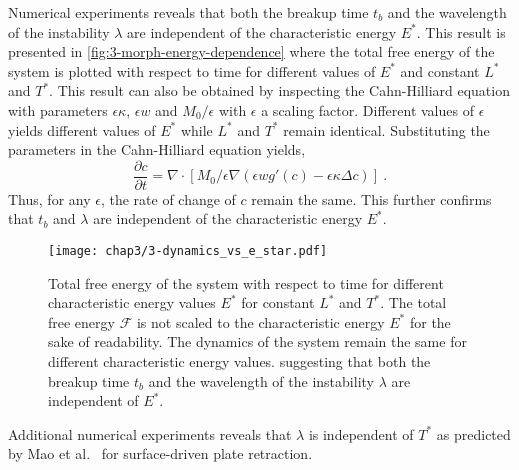 Numerical experiments reveals that both the breakup time $t_b$ and the wavelength of the instability $\lambda$ are independent of the characteristic energy $E^*$. This result is presented in \autoref{fig:3-morph-energy-dependence} where the total free energy of the system is plotted with respect to time for different values of $E^*$ and constant $L^*$ and $T^*$. This result can also be obtained by inspecting the Cahn-Hilliard equation with parameters $\epsilon\kappa$, $\epsilon w$ and $M_0/\epsilon$ with $\epsilon$ a scaling factor. Different values of $\epsilon$ yields different values of $E^*$ while $L^*$ and $T^*$ remain identical. Substituting the parameters in the Cahn-Hilliard equation yields,
\begin{equation}
    \frac{\partial c}{\partial t} = \nabla \cdot \left[ M_0/\epsilon \nabla \left( \epsilon w g'(c) - \epsilon \kappa \Delta c \right) \right]\ .
\end{equation}
Thus, for any $\epsilon$, the rate of change of $c$ remain the same. This further confirms that $t_b$ and $\lambda$ are independent of the characteristic energy $E^*$.
\begin{figure}[H]
    \centering
    \texttt{[image: chap3/3-dynamics\_vs\_e\_star.pdf]}
    \caption{Total free energy of the system with respect to time for different characteristic energy values $E^*$ for constant $L^*$ and $T^*$. The total free energy $\mathcal{F}$ is not scaled to the characteristic energy $E^*$ for the sake of readability. The dynamics of the system remain the same for different characteristic energy values. suggesting that both the breakup time $t_b$ and the wavelength of the instability $\lambda$ are independent of $E^*$.}
    \label{fig:3-morph-energy-dependence}
\end{figure}
Additional numerical experiments reveals that $\lambda$ is independent of $T^*$ as predicted by Mao et al.~\cite{MaoDemkowicz2021} for surface-driven plate retraction.\\
